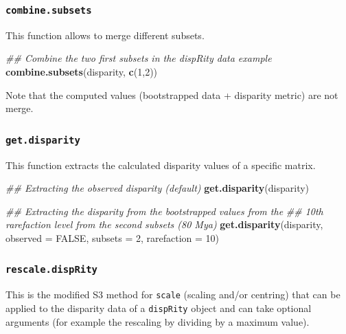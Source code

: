 \documentclass[
]{book}
\newenvironment{Shaded}{\begin{snugshade}}{\end{snugshade}}
\newcommand{\CommentTok}[1]{\textcolor[rgb]{0.56,0.35,0.01}{\textit{#1}}}
\newcommand{\DataTypeTok}[1]{\textcolor[rgb]{0.13,0.29,0.53}{#1}}
\newcommand{\DecValTok}[1]{\textcolor[rgb]{0.00,0.00,0.81}{#1}}
\newcommand{\KeywordTok}[1]{\textcolor[rgb]{0.13,0.29,0.53}{\textbf{#1}}}
\newcommand{\NormalTok}[1]{#1}
\newcommand{\OtherTok}[1]{\textcolor[rgb]{0.56,0.35,0.01}{#1}}
\begin{document}
\hypertarget{combine.subsets}{%
\subsubsection{\texorpdfstring{\texttt{combine.subsets}}{combine.subsets}}\label{combine.subsets}}

This function allows to merge different subsets.

\begin{Shaded}
\begin{Highlighting}[]
\CommentTok{\#\# Combine the two first subsets in the dispRity data example}
\KeywordTok{combine.subsets}\NormalTok{(disparity, }\KeywordTok{c}\NormalTok{(}\DecValTok{1}\NormalTok{,}\DecValTok{2}\NormalTok{))}
\end{Highlighting}
\end{Shaded}

Note that the computed values (bootstrapped data + disparity metric) are not merge.

\hypertarget{get.disparity}{%
\subsubsection{\texorpdfstring{\texttt{get.disparity}}{get.disparity}}\label{get.disparity}}

This function extracts the calculated disparity values of a specific matrix.

\begin{Shaded}
\begin{Highlighting}[]
\CommentTok{\#\# Extracting the observed disparity (default)}
\KeywordTok{get.disparity}\NormalTok{(disparity)}

\CommentTok{\#\# Extracting the disparity from the bootstrapped values from the}
\CommentTok{\#\# 10th rarefaction level from the second subsets (80 Mya)}
\KeywordTok{get.disparity}\NormalTok{(disparity, }\DataTypeTok{observed =} \OtherTok{FALSE}\NormalTok{, }\DataTypeTok{subsets =} \DecValTok{2}\NormalTok{, }\DataTypeTok{rarefaction =} \DecValTok{10}\NormalTok{)}
\end{Highlighting}
\end{Shaded}

\hypertarget{rescale.disprity}{%
\subsubsection{\texorpdfstring{\texttt{rescale.dispRity}}{rescale.dispRity}}\label{rescale.disprity}}

This is the modified S3 method for \texttt{scale} (scaling and/or centring) that can be applied to the disparity data of a \texttt{dispRity} object and can take optional arguments (for example the rescaling by dividing by a maximum value).
\end{document}

